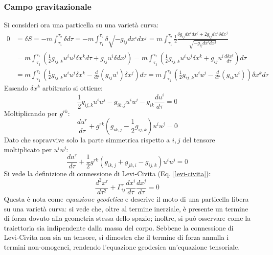 \subsubsection{Campo gravitazionale}

Si consideri ora una particella su una varietà curva:
\begin{equation*}
	\begin{split}
		0
		&= \delta S = -m \int_{\tau_1}^{\tau_2} \delta d\tau = -m \int_{\tau_1}^{\tau_2} \delta \sqrt{- g_{ij} dx^i dx^j} = m \int_{\tau_1}^{\tau_2} \frac{1}{2} \frac{\delta g_{ij} dx^i dx^j + 2g_{ij} dx^i \delta dx^j}{\sqrt{- g_{ij} dx^i dx^j}}\\
		&= m \int_{\tau_1}^{\tau_2} \left( \frac{1}{2} g_{ij,k} u^i u^j \delta x^k d\tau + g_{ij} u^i \delta dx^j \right) = m \int_{\tau_1}^{\tau_2} \left( \frac{1}{2} g_{ij,k} u^i u^j \delta x^k + g_{ij} u^i \frac{d\delta x^j}{d\tau} \right) d\tau\\
		&= m \int_{\tau_1}^{\tau_2} \left( \frac{1}{2} g_{ij,k} u^i u^j \delta x^k - \frac{d}{d\tau} \left( g_{ij} u^i \right) \delta x^j \right) d\tau = m \int_{\tau_1}^{\tau_2} \left( \frac{1}{2} g_{ij,k} u^i u^j - \frac{d}{d\tau} \left( g_{ik} u^i \right) \right) \delta x^k d\tau
	\end{split}
\end{equation*}
Essendo $ \delta x^k $ arbitrario si ottiene:
\begin{equation}
	\frac{1}{2} g_{ij,k} u^i u^j - g_{ik,j} u^i u^j - g_{ik} \frac{du^i}{d\tau} = 0
	\label{eq:5.9}
\end{equation}
Moltiplicando per $ g^{rk} $:
\begin{equation}
	\frac{du^r}{d\tau} + g^{rk} \left( g_{ik,j} - \frac{1}{2} g_{ij,k} \right) u^i u^j = 0
	\label{eq:5.10}
\end{equation}
Dato che sopravvive solo la parte simmetrica rispetto a $ i,j $ del tensore moltiplicato per $ u^i u^j $:
\begin{equation}
	\frac{du^r}{d\tau} + \frac{1}{2} g^{rk} \left( g_{ik,j} + g_{jk,i} - g_{ij,k} \right) u^i u^j = 0
	\label{eq:5.11}
\end{equation}
Si vede la definizione di connessione di Levi-Civita (Eq. \ref{levi-civita}):
\begin{equation}
	\frac{d^2 x^r}{d\tau^2} + \Gamma^r_{ij} \frac{dx^i}{d\tau} \frac{dx^j}{d\tau} = 0
	\label{eq:5.12}
\end{equation}
Questa è nota come \textit{equazione geodetica} e descrive il moto di una particella libera su una varietà curva: si vede che, oltre al termine inerziale, è presente un termine di forza dovuto alla geometria stessa dello spazio; inoltre, si può osservare come la traiettoria sia indipendente dalla massa del corpo.
Sebbene la connessione di Levi-Civita non sia un tensore, si dimostra che il termine di forza annulla i termini non-omogenei, rendendo l'equazione geodesica un'equazione tensoriale.

